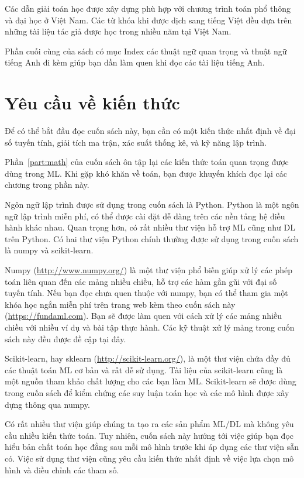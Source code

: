 Các dẫn giải toán học được xây dựng phù hợp với chương trình toán phổ thông và
đại học ở Việt Nam. Các từ khóa khi được dịch sang tiếng Việt đều dựa trên những
tài liệu tác giả được học trong nhiều năm tại Việt Nam.

Phần cuối cùng của sách có mục Index các thuật ngữ quan trọng và thuật ngữ tiếng Anh đi kèm giúp bạn dần làm quen khi đọc các tài liệu tiếng Anh. 


\section{Yêu cầu về kiến thức}

Để có thể bắt đầu đọc cuốn sách này, bạn cần có một kiến thức nhất định về đại
số tuyến tính, giải tích ma trận, xác suất thống kê, và kỹ năng lập trình.

Phần~\ref{part:math} của cuốn sách ôn tập lại các kiến thức toán quan trọng được
dùng trong ML. Khi gặp khó khăn về toán, bạn được khuyến khích đọc lại các
chương trong phần này.

Ngôn ngữ lập trình được sử dụng trong cuốn sách là Python. Python là một ngôn
ngữ lập trình miễn phí, có thể được cài đặt dễ dàng trên các nền tảng hệ điều
hành khác nhau. Quan trọng hơn, có rất nhiều thư viện hỗ trợ ML cũng như DL
trên Python. Có hai thư viện Python chính thường được sử dụng trong
cuốn sách là numpy và scikit-learn. 

Numpy (\url{http://www.numpy.org/}) là một thư viện phổ biến giúp xử lý các phép
toán liên quan đến các mảng nhiều chiều, hỗ trợ các hàm gần gũi với đại số tuyến
tính. Nếu bạn đọc chưa quen thuộc với numpy, bạn có thể tham gia một khóa học
ngắn miễn phí trên trang web kèm theo cuốn sách này (\url{https://fundaml.com}).
Bạn sẽ được làm quen với cách xử lý các mảng nhiều chiều với nhiều ví dụ và bài
tập thực hành. Các kỹ thuật xử lý mảng trong cuốn sách này đều được đề cập tại
đây.

Scikit-learn, hay sklearn (\url{http://scikit-learn.org/}), là một thư viện chứa
đầy đủ các thuật toán ML cơ bản và rất dễ sử dụng. Tài liệu của scikit-learn
cũng là một nguồn tham khảo chất lượng cho các bạn làm ML. Scikit-learn sẽ được
dùng trong cuốn sách để kiểm chứng các suy luận toán học và các mô hình được xây
dựng thông qua numpy.

Có rất nhiều thư viện giúp chúng ta tạo ra các sản phẩm ML/DL mà không yêu
cầu nhiều kiến thức toán. Tuy nhiên, cuốn sách này hướng tới việc giúp bạn đọc
hiểu bản chất toán học đằng sau mỗi mô hình trước khi áp dụng các thư viện sẵn
có. Việc sử dụng thư viện cũng yêu cầu kiến thức nhất định về việc lựa chọn mô
hình và điều chỉnh các tham số.
